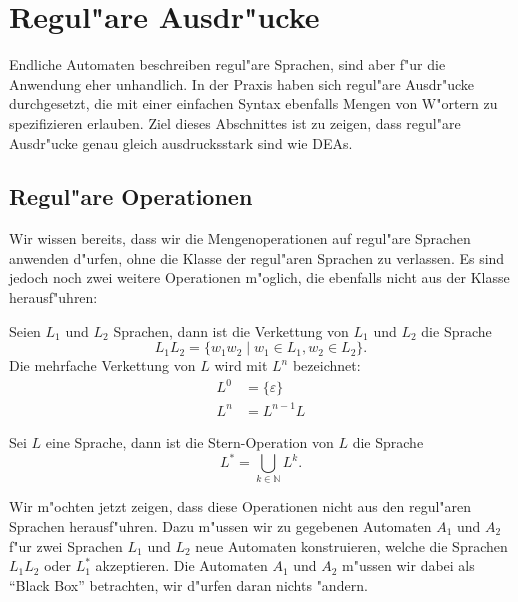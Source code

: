 \section{Regul"are Ausdr"ucke}
Endliche Automaten beschreiben regul"are Sprachen, sind aber f"ur die
Anwendung eher unhandlich. In der Praxis haben sich regul"are Ausdr"ucke
durchgesetzt, die mit einer einfachen Syntax ebenfalls Mengen von
W"ortern zu spezifizieren erlauben. Ziel dieses Abschnittes ist
zu zeigen, dass regul"are Ausdr"ucke genau gleich ausdrucksstark sind
wie DEAs.

\subsection{Regul"are Operationen}
Wir wissen bereits, dass wir die Mengenoperationen auf regul"are
Sprachen anwenden d"urfen, ohne die Klasse der regul"aren Sprachen
zu verlassen.
Es sind jedoch noch zwei weitere Operationen m"oglich, die ebenfalls
nicht aus der Klasse herausf"uhren:

\begin{definition}
Seien $L_1$ und $L_2$ Sprachen, dann ist die
Verkettung von $L_1$ und $L_2$ die Sprache
\[
L_1L_2=\{w_1w_2\;|\;w_1\in L_1,w_2\in L_2\}.
\]
Die mehrfache Verkettung von $L$ wird mit $L^n$ bezeichnet:
\begin{align*}
L^0&=\{\varepsilon\}\\
L^n&=L^{n-1}L
\end{align*}
\end{definition}

\begin{definition}
Sei $L$ eine Sprache, dann ist die Stern-Operation
von $L$ die Sprache
\[
L^*=\bigcup_{k\in\mathbb N} L^k.
\]
\end{definition}

Wir m"ochten jetzt zeigen, dass diese Operationen nicht aus den
regul"aren Sprachen herausf"uhren. Dazu m"ussen wir zu gegebenen
Automaten $A_1$ und $A_2$ f"ur zwei Sprachen $L_1$ und $L_2$
neue Automaten konstruieren, welche
die Sprachen $L_1L_2$ oder $L_1^*$ akzeptieren. Die Automaten
$A_1$ und $A_2$ m"ussen wir dabei als ``Black Box'' betrachten,
wir d"urfen daran nichts "andern.

